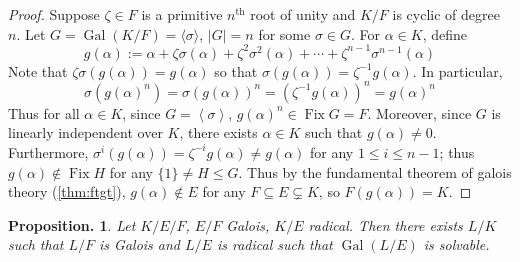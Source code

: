 \documentclass[11pt, a4paper]{memoir}
\newcommand{\brac}[1]{\ensuremath{\left\langle #1 \right\rangle}}
\theoremstyle{change}
\newtheorem{proposition}[theorem]{Proposition.}
\theoremstyle{plain}
\theoremstyle{nonumberplain}
\newtheorem{proof}{Proof}
\DeclareMathOperator{\Fix}{Fix}
\DeclareMathOperator{\Gal}{Gal}
\numberwithin{equation}{section}
\begin{document}
\begin{proof}
    Suppose $\zeta\in F$ is a primitive $n^\text{th}$ root of unity and $K/F$ is cyclic of degree $n$.
    Let $G=\Gal(K/F)=\langle\sigma\rangle$, $|G|=n$ for some $\sigma\in G$.
    For $\alpha\in K$, define
    \begin{equation*}
        g(\alpha):=\alpha+\zeta\sigma(\alpha)+\zeta^2\sigma^2(\alpha)+\cdots+\zeta^{n-1}\sigma^{n-1}(\alpha)
    \end{equation*}
    Note that $\zeta\sigma(g(\alpha))=g(\alpha)$ so that $\sigma(g(\alpha))=\zeta^{-1}g(\alpha)$.
    In particular,
    \begin{equation*}
        \sigma(g(\alpha)^n)=\sigma(g(\alpha))^n=\left(\zeta^{-1}g(\alpha)\right)^n=g(\alpha)^n
    \end{equation*}
    Thus for all $\alpha\in K$, since $G=\brac{\sigma}$, $g(\alpha)^n\in\Fix G=F$.
    Moreover, since $G$ is linearly independent over $K$, there exists $\alpha\in K$ such that $g(\alpha)\neq 0$.
    Furthermore, $\sigma^i(g(\alpha))=\zeta^{-i}g(\alpha)\neq g(\alpha)$ for any $1\leq i\leq n-1$; thus $g(\alpha)\notin\Fix H$ for any $\{1\}\neq H\leq G$.
    Thus by the fundamental theorem of galois theory (\cref{thm:ftgt}), $g(\alpha)\notin E$ for any $F\subseteq E\subsetneq K$, so $F(g(\alpha))=K$.
\end{proof}
\begin{proposition}
    Let $K/E/F$, $E/F$ Galois, $K/E$ radical.
    Then there exists $L/K$ such that $L/F$ is Galois and $L/E$ is radical such that $\Gal(L/E)$ is solvable.
\end{proposition}
\end{document}
